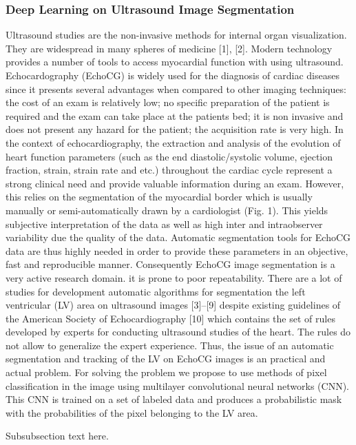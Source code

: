 \documentclass[journal]{IEEEtran}
\begin{document}
\subsubsection{Deep Learning on Ultrasound Image Segmentation}
Ultrasound studies are the non-invasive methods for internal organ visualization. They are widespread in many spheres of medicine [1], [2]. Modern technology provides a number of tools to access myocardial function with using ultrasound. Echocardography (EchoCG) is widely used for the diagnosis of cardiac diseases since it presents several advantages when compared to other imaging techniques: the cost of an exam is relatively low; no specific preparation of the patient is required and the exam can take place at the patients bed; it is non invasive and does not present any hazard for the patient; the acquisition rate is very high. In the context of echocardiography, the extraction and analysis of the evolution of heart function parameters (such as the end diastolic/systolic volume, ejection fraction, strain, strain rate and etc.) throughout the cardiac cycle represent a strong clinical need and provide valuable information during an exam. However, this relies on the segmentation of the myocardial border which is usually manually or semi-automatically drawn by a cardiologist (Fig. 1). This yields subjective interpretation of the data as well as high inter and intraobserver variability due the quality of the data. Automatic segmentation tools for EchoCG data are thus highly needed in order to provide these parameters in an objective, fast and reproducible manner. Consequently EchoCG image segmentation is a very active research domain. it is prone to poor repeatability.
There are a lot of studies for development automatic algorithms for segmentation the left ventricular (LV) area on ultrasound images [3]–[9] despite existing guidelines of the American Society of Echocardiography [10] which contains the set of rules developed by experts for conducting ultrasound studies of the heart. The rules do not allow to generalize the expert experience. Thus, the issue of an automatic segmentation and tracking of the LV on EchoCG images is an practical and actual problem. For solving the problem we propose to use methods of pixel classification in the image using multilayer convolutional neural networks (CNN). This CNN is trained on a set of labeled data and produces a probabilistic mask with the probabilities of the pixel belonging to the LV area. 

Subsubsection text here.
\end{document}
